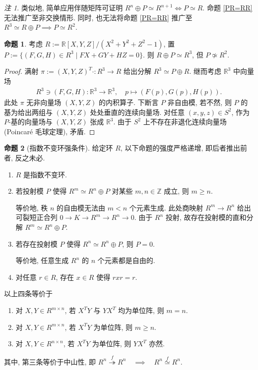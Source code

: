 \documentclass{MainStyle}
\theoremstyle{definition}
\theoremstyle{definition}
\theoremstyle{definition}
\theoremstyle{definition}
\newtheorem{proposition}{命题}
\theoremstyle{definition}
\theoremstyle{definition}
\theoremstyle{definition}
\theoremstyle{remark}
\newtheorem{remark}{注}
\theoremstyle{remark}
\begin{document}
\begin{remark}
    类似地, 简单应用伴随矩阵可证明 $R^n\oplus P\simeq R^{n+1}\Leftrightarrow P\simeq R$. 命题 \ref{PR=RR} 无法推广至非交换情形. 同时, 也无法将命题 \ref{PR=RR} 推广至 $R^3\simeq R\oplus P\implies P\simeq R^2$.
\end{remark}


\begin{proposition}
    考虑 $R:=\mathbb R[X,Y,Z]/(X^2+Y^2+Z^2-1)$, 置 $P:=\{(F,G,H)\in R^3\mid FX+GY+HZ=0\}$. 则 $R\oplus P\simeq R^3$, 但 $P\not\simeq R^2$.
    \begin{proof}
        满射 $\pi:=(X,Y,Z)^T\cdot :R^3\to R$ 给出分解 $R^3\simeq P\oplus R$. 继而考虑 $\mathbb R^3$ 中向量场
        \begin{align*}
            R^3\ni (F,G,H):\mathbb R^3\to \mathbb R^3,\quad p\mapsto (F(p),G(p),H(p)).
        \end{align*}
        此处 $\pi$ 无非向量场 $(X,Y,Z)$ 的内积算子. 下断言 $P$ 非自由模, 若不然, 则 $P$ 的基为给出两组与 $(X,Y,Z)$ 处处垂直的连续向量场. 对任意 $(x,y,z)\in S^2$, 作为 $P$-基的向量场与 $(X,Y,Z)$ 张成 $\mathbb R^3$. 由于 $S^2$ 上不存在非退化连续向量场(Poincaré 毛球定理), 矛盾.
    \end{proof}
\end{proposition}

\begin{proposition}[指数不变环强条件]
    给定环 $R$, 以下命题的强度严格递增, 即后者推出前者, 反之未必.
    \begin{enumerate}
        \item $R$ 是指数不变环.
        \item 若投射模 $P$ 使得 $R^m\simeq R^n\oplus P$ 对某些 $m,n\in \mathbb Z$ 成立, 则 $m\geq n$. \par
              等价地, 秩 $n$ 的自由模无法由 $m<n$ 个元素生成. 此处商映射 $R^m\to R^n$ 给出可裂短正合列 $0\to K\to R^m\to R^n\to 0$. 由于 $R^n$ 投射, 故存在投射模的直和分解 $R^m\simeq R^n\oplus P$.
        \item 若存在投射模 $P$ 使得 $R^n\simeq R^n\oplus P$, 则 $P=0$. \par
              等价地, 任意生成 $R^n$ 的 $n$ 个元素都是自由的.
        \item 对任意 $r\in R$, 存在 $x\in R$ 使得 $rxr=r$.
    \end{enumerate}
    以上四条等价于
    \begin{enumerate}
        \item 对 $X,Y\in R^{m\times n}$, 若 $X^TY$ 与 $YX^T$ 均为单位阵, 则 $m=n$.
        \item 对 $X,Y\in R^{m\times n}$, 若 $X^TY$ 为单位阵, 则 $m\geq n$.
        \item 对 $X,Y\in R^{n\times n}$, 若 $X^TY$ 为单位阵, 则 $YX^T$ 亦然.
    \end{enumerate}
    其中, 第三条等价于中山性, 即 $R^n\overset f\twoheadrightarrow R^n\quad \implies \quad R^n\overset f\simeq R^n$.
\end{proposition}
\end{document}
